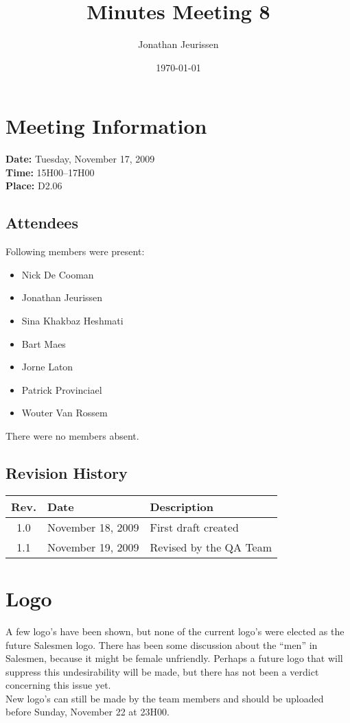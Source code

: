 \documentclass[a4paper, 12pt]{article}
\begin{document}
\title{Minutes Meeting 8}
\author{Jonathan Jeurissen}
\date{\today}

\maketitle	
	\section{Meeting Information}
		\textbf{Date:} Tuesday, November 17, 2009\\
		\textbf{Time:} 15H00--17H00\\
		\textbf{Place:} D2.06\\
		\subsection{Attendees}
Following members were present:
			\begin{itemize}
				\item Nick De Cooman
				\item Jonathan Jeurissen
				\item Sina Khakbaz Heshmati
				\item Bart Maes
				\item Jorne Laton
				\item Patrick Provinciael
				\item Wouter Van Rossem
			\end{itemize}
There were no members absent.
			
		\subsection{Revision History}
			\begin{tabular}{c | l | l }
				\textbf{Rev.} & \textbf{Date} & \textbf{Description} \\
				\hline
				1.0 & November 18, 2009 & First draft created \\
				1.1 & November 19, 2009 & Revised by the QA Team \\
			\end{tabular}		

	\section{Logo}
A few logo's have been shown, but none of the current logo's were elected as the future Salesmen logo. There has been some discussion about the ``men'' in Salesmen, because it might be female unfriendly. Perhaps a future logo that will suppress this undesirability will be made, but there has not been a verdict concerning this issue yet. \\
New logo's can still be made by the team members and should be uploaded before Sunday, November 22 at 23H00.
\end{document}

